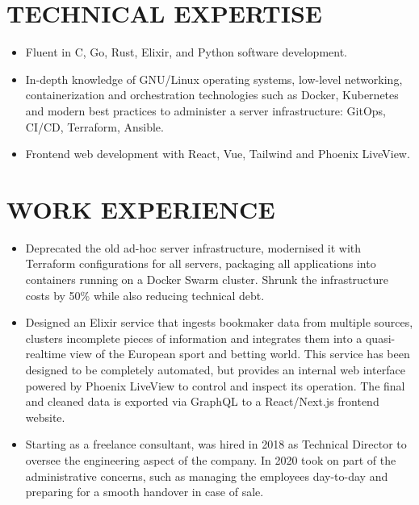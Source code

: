 \documentclass{resume}
\begin{document}

\section{TECHNICAL EXPERTISE}

\begin{itemize}
\item Fluent in C, Go, Rust, Elixir, and Python software development.
\item In-depth knowledge of GNU/Linux operating systems, low-level networking, containerization and orchestration technologies such as Docker, Kubernetes and modern best practices to administer a server infrastructure: GitOps, CI/CD, Terraform, Ansible.
\item Frontend web development with React, Vue, Tailwind and Phoenix LiveView.
\end{itemize}

\section{WORK EXPERIENCE}


\begin{itemize}
\item Deprecated the old ad-hoc server infrastructure, modernised it with Terraform configurations for all servers, packaging all applications into containers running on a Docker Swarm cluster. Shrunk the infrastructure costs by 50\% while also reducing technical debt.
\item Designed an Elixir service that ingests bookmaker data from multiple sources, clusters incomplete pieces of information and integrates them into a quasi-realtime view of the European sport and betting world. This service has been designed to be completely automated, but provides an internal web interface powered by Phoenix LiveView to control and inspect its operation. The final and cleaned data is exported via GraphQL to a React/Next.js frontend website.
\item Starting as a freelance consultant, was hired in 2018 as Technical Director to oversee the engineering aspect of the company. In 2020 took on part of the administrative concerns, such as managing the employees day-to-day and preparing for a smooth handover in case of sale.
\end{itemize}
\end{document}

